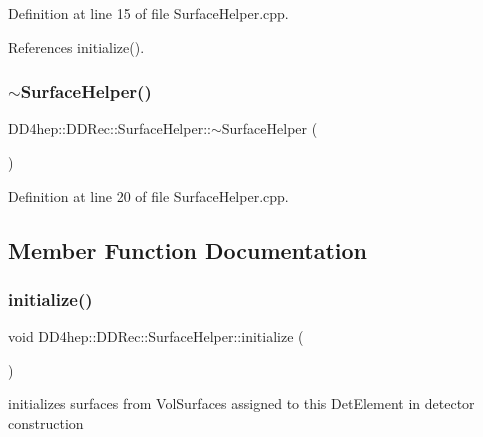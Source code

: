 Definition at line 15 of file Surface\+Helper.\+cpp.



References initialize().

\hypertarget{class_d_d4hep_1_1_d_d_rec_1_1_surface_helper_ae56de2da052504fa76ade5995a2d363d}{}\label{class_d_d4hep_1_1_d_d_rec_1_1_surface_helper_ae56de2da052504fa76ade5995a2d363d} 
\subsubsection{\texorpdfstring{$\sim$\+Surface\+Helper()}{~SurfaceHelper()}}
{\footnotesize\ttfamily D\+D4hep\+::\+D\+D\+Rec\+::\+Surface\+Helper\+::$\sim$\+Surface\+Helper (\begin{DoxyParamCaption}{ }\end{DoxyParamCaption})}



Definition at line 20 of file Surface\+Helper.\+cpp.



\subsection{Member Function Documentation}
\hypertarget{class_d_d4hep_1_1_d_d_rec_1_1_surface_helper_ac394507ee2065b75f9540b388fd87170}{}\label{class_d_d4hep_1_1_d_d_rec_1_1_surface_helper_ac394507ee2065b75f9540b388fd87170} 
\subsubsection{\texorpdfstring{initialize()}{initialize()}}
{\footnotesize\ttfamily void D\+D4hep\+::\+D\+D\+Rec\+::\+Surface\+Helper\+::initialize (\begin{DoxyParamCaption}{ }\end{DoxyParamCaption})\hspace{0.3cm}{\ttfamily [protected]}}



initializes surfaces from Vol\+Surfaces assigned to this Det\+Element in detector construction 



